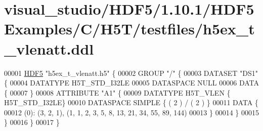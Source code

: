 \hypertarget{visual__studio_2_h_d_f5_21_810_81_2_h_d_f5_examples_2_c_2_h5_t_2testfiles_2h5ex__t__vlenatt_8ddl_source}{}\section{visual\+\_\+studio/\+H\+D\+F5/1.10.1/\+H\+D\+F5\+Examples/\+C/\+H5\+T/testfiles/h5ex\+\_\+t\+\_\+vlenatt.ddl}
\label{visual__studio_2_h_d_f5_21_810_81_2_h_d_f5_examples_2_c_2_h5_t_2testfiles_2h5ex__t__vlenatt_8ddl_source}

\begin{DoxyCode}
00001 \hyperlink{namespace_h_d_f5}{HDF5} \textcolor{stringliteral}{"h5ex\_t\_vlenatt.h5"} \{
00002 GROUP \textcolor{stringliteral}{"/"} \{
00003    DATASET \textcolor{stringliteral}{"DS1"} \{
00004       DATATYPE  H5T\_STD\_I32LE
00005       DATASPACE  NULL
00006       DATA \{
00007       \}
00008       ATTRIBUTE \textcolor{stringliteral}{"A1"} \{
00009          DATATYPE  H5T\_VLEN \{ H5T\_STD\_I32LE\}
00010          DATASPACE  SIMPLE \{ ( 2 ) / ( 2 ) \}
00011          DATA \{
00012          (0): (3, 2, 1), (1, 1, 2, 3, 5, 8, 13, 21, 34, 55, 89, 144)
00013          \}
00014       \}
00015    \}
00016 \}
00017 \}
\end{DoxyCode}
